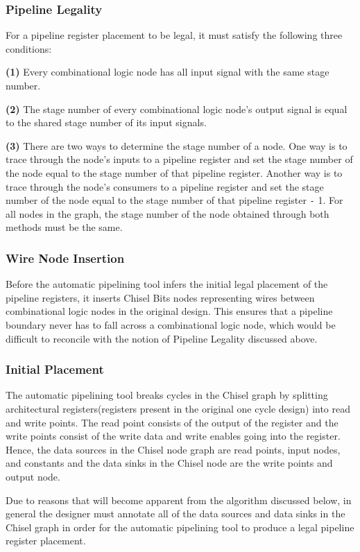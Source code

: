 \subsubsection{Pipeline Legality}
For a pipeline register placement to be legal, it must satisfy the following three conditions:

{\bf (1)} Every combinational logic node has all input signal with the same stage number.  

{\bf (2)} The stage number of every combinational logic node's output signal is equal to the shared stage number of its input signals.

{\bf (3)} There are two ways to determine the stage number of a node. One way is to trace through the node's inputs to a pipeline register and set the stage number of the node equal to the stage number of that pipeline register. Another way is to trace through the node’s consumers to a pipeline register and set the stage number of the node equal to the stage number of that pipeline register {\tt -}  1. For all nodes in the graph, the stage number of the node obtained through both methods must be the same.

\subsubsection{Wire Node Insertion}
\label{wiresection}
Before the automatic pipelining tool infers the initial legal placement of the pipeline registers, it inserts Chisel Bits nodes representing wires between combinational logic nodes in the original design. This ensures that a pipeline boundary never has to fall across a combinational logic node, which would be difficult to reconcile with the notion of Pipeline Legality discussed above.
\subsubsection{Initial Placement}
The automatic pipelining tool breaks cycles in the Chisel graph by splitting architectural registers(registers present in the original one cycle design) into read and write points. The read point consists of the output of the register and the write points consist of the write data and write enables going into the register. Hence, the data sources in the Chisel node graph are read points, input nodes, and constants and the data sinks in the Chisel node are the write points and output node.

Due to reasons that will become apparent from the algorithm discussed below, in general the designer must annotate all of the data sources and data sinks in the Chisel graph in order for the automatic pipelining tool to produce a legal pipeline register placement.


